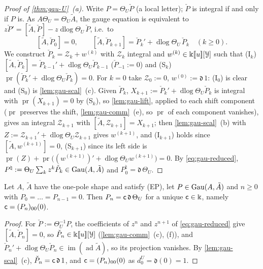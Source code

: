 
\begin{proof}[Proof of \cref{thm:gau-U}~(a)]
Write $P=\Theta_U\check P$ (a local letter); $\check P$ is integral if and only if $P$ is. As $A\Theta_U=\Theta_U\tilde A$, the gauge equation is equivalent to $z\check P'=[\tilde A,\check P]-z\operatorname{dlog}\Theta_U\,\check P$, i.e.\ to
\begin{equation}
\label{eq:gau-reduced}
[\tilde A,\check P_0]=0,\qquad [\tilde A,\check P_{k+1}]=\check P_k'+\operatorname{dlog}\Theta_U\,\check P_k\quad(k\geq0).
\end{equation}
We construct $\check P_k=\mathcal Z_k+w^{(k)}$ with $\mathcal Z_k$ integral and $w^{(k)}\in\Bbbk[\![ u ]\!][\mathcal Y]$ such that (I$_k$) $[\tilde A,\check P_k]=\check P_{k-1}'+\operatorname{dlog}\Theta_U\check P_{k-1}$ ($\check P_{-1}:=0$) and (S$_k$) $\operatorname{pr}(\check P_k'+\operatorname{dlog}\Theta_U\check P_k)=0$. For $k=0$ take $\mathcal Z_0:=0$, $w^{(0)}:=\mathfrak d\,1$: (I$_0$) is clear and (S$_0$) is \cref{lem:gau-scal}~(c). Given $\check P_k$, $X_{k+1}:=\check P_k'+\operatorname{dlog}\Theta_U\check P_k$ is integral with $\operatorname{pr}(X_{k+1})=0$ by (S$_k$), so \cref{lem:gau-lift}, applied to each shift component ($\operatorname{pr}$ preserves the shift, \cref{lem:gau-comm}~(e), so $\operatorname{pr}$ of each component vanishes), gives an integral $\mathcal Z_{k+1}$ with $[\tilde A,\mathcal Z_{k+1}]=X_{k+1}$; then \cref{lem:gau-scal}~(b) with $Z:=\mathcal Z_{k+1}'+\operatorname{dlog}\Theta_U\mathcal Z_{k+1}$ gives $w^{(k+1)}$, and (I$_{k+1}$) holds since $[\tilde A,w^{(k+1)}]=0$, (S$_{k+1}$) since its left side is $\operatorname{pr}(Z)+\operatorname{pr}\bigl((w^{(k+1)})'+\operatorname{dlog}\Theta_Uw^{(k+1)}\bigr)=0$. By \eqref{eq:gau-reduced}, $P^\natural:=\Theta_U\sum_kz^k\check P_k\in\operatorname{Gau}(A,\tilde A)$ and $P^\natural_0=\mathfrak d\,\Theta_U$.
\end{proof}

\begin{lem}
\label{lem:gau-lead}
Let $A$, $\tilde A$ have the one-pole shape and satisfy (EP), let $P\in\operatorname{Gau}(A,\tilde A)$ and $n\geq0$ with $P_0=\dots=P_{n-1}=0$. Then $P_n=\mathsf{c}\,\mathfrak d\,\Theta_U$ for a unique $\mathsf{c}\in\Bbbk$, namely $\mathsf{c}=(P_n)_{00}(0)$.
\end{lem}

\begin{proof}
For $\check P:=\Theta_U^{-1}P$, the coefficients of $z^n$ and $z^{n+1}$ of \eqref{eq:gau-reduced} give $[\tilde A,\check P_n]=0$, so $\check P_n\in\Bbbk[\![ u ]\!][\mathcal Y]$ (\cref{lem:gau-comm}~(c), (f)), and $\check P_n'+\operatorname{dlog}\Theta_U\check P_n\in\operatorname{im}(\operatorname{ad}\tilde A)$, so its projection vanishes. By \cref{lem:gau-scal}~(c), $\check P_n=\mathsf{c}\,\mathfrak d\,1$, and $\mathsf{c}=(P_n)_{00}(0)$ as $d^U_0=\mathfrak d(0)=1$.
\end{proof}

